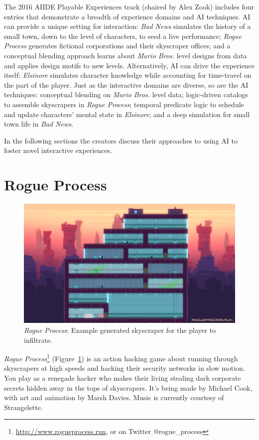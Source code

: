 \documentclass[letterpaper]{article}
\begin{document}
The 2016 AIIDE Playable Experiences track (chaired by Alex Zook) includes four entries that demonstrate a breadth of experience domains and AI techniques.
AI can provide a unique setting for interaction: \textit{Bad News} simulates the history of a small town, down to the level of characters, to seed a live performance; \textit{Rogue Process} generates fictional corporations and their skyscraper offices; and a conceptual blending approach learns about \textit{Mario Bros.} level designs from data and applies design motifs to new levels.
Alternatively, AI can drive the experience itself: \textit{Elsinore} simulates character knowledge while accounting for time-travel on the part of the player.
Just as the interactive domains are diverse, so are the AI techniques: conceptual blending on \textit{Mario Bros.} level data; logic-driven catalogs to assemble skyscrapers in \textit{Rogue Process}; temporal predicate logic to schedule and update characters' mental state in \textit{Elsinore}; and a deep simulation for small town life in \textit{Bad News}.

In the following sections the creators discuss their approaches to using AI to foster novel interactive experiences.


\section{Rogue Process}

\begin{figure}[tbh]
  \centering
  \includegraphics[width=\columnwidth]{images/rogue_process-screen}
  \caption{\textit{Rogue Process}: Example generated skyscraper for the player to infiltrate.}
  \label{fig:rp-setting}
\end{figure}


\textit{Rogue Process}\footnote{\url{http://www.rogueprocess.run}, or on Twitter @rogue\_process} (Figure~\ref{fig:rp-setting}) is an action hacking game about running through skyscrapers at high speeds and hacking their security networks in slow motion.
You play as a renegade hacker who makes their living stealing dark corporate secrets hidden away in the tops of skyscrapers.
It's being made by Michael Cook, with art and animation by Marsh Davies.
Music is currently courtesy of Strangelette.
\end{document}

